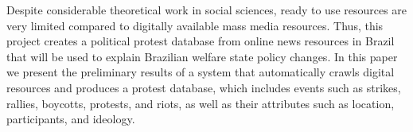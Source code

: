 Despite considerable theoretical work in social sciences, ready to use resources are very limited compared to digitally available mass media resources. Thus, this project creates a political protest database from online news resources in Brazil that will be used to explain Brazilian welfare state policy changes. In this paper we present the preliminary results of a system that automatically crawls digital resources and produces a protest database, which includes events such as strikes, rallies, boycotts, protests, and riots, as well as their attributes such as location, participants, and ideology.
